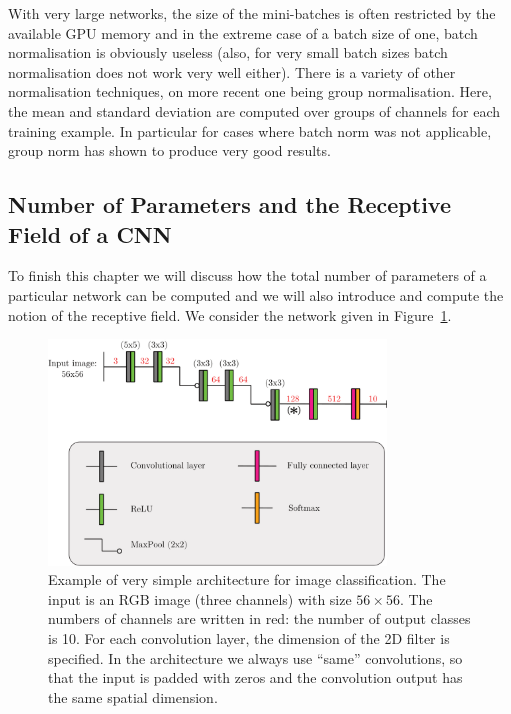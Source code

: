 With very large networks, the size of the mini-batches is often restricted by
the available GPU memory and in the extreme case of a batch size of one, batch
normalisation is obviously useless (also, for very small batch sizes batch
normalisation does not work very well either). There is a variety of other
normalisation techniques, on more recent one being group normalisation. Here,
the mean and standard deviation are computed over groups of channels for each
training example. In particular for cases where batch norm was not applicable,
group norm has shown to produce very good results.

\subsection*{Number of Parameters and the Receptive Field of a CNN}
To finish this chapter we will discuss how the total number of parameters of a
particular network can be computed and we will also introduce and compute the
notion of the receptive field. We consider the network given in
Figure~\ref{fig:cnn_arch}.

\begin{figure}[htpb]
  \centering \includegraphics[width=0.8\textwidth]{Figures/cnn_arch}
  \caption{Example of very simple architecture for image classification. The
    input is an RGB image (three channels) with size $56\times 56$. The numbers
    of channels are written in red: the number of output classes is 10. For each
    convolution layer, the dimension of the 2D filter is specified. In the
    architecture we always use ``same'' convolutions, so that the input is
    padded with zeros and the convolution output has the same spatial
    dimension.}%
  \label{fig:cnn_arch}
\end{figure}


